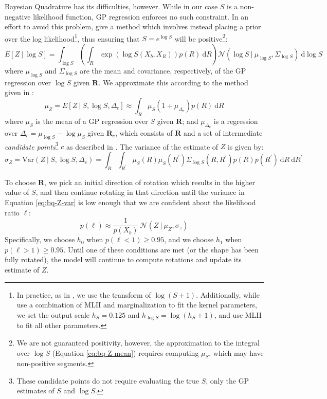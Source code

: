 \documentclass{article} %
\begin{document}
Bayesian Quadrature has its difficulties, however. While in our case
$S$ is a non-negative likelihood function, GP regression enforces no
such constraint. In an effort to avoid this problem,
\cite{Osborne:2012tm} give a method which involves instead placing a
prior over the log likelihood\footnote{In practice, as in
  \cite{Osborne:2012tm}, we use the transform of
  $\log(S+1)$. Additionally, while \cite{Osborne:2012tm} use a
  combination of MLII and marginalization to fit the kernel
  parameters, we set the output scale $h_S=0.125$ and $h_{\log
    S}=\log(h_S + 1)$, and use MLII to fit all other parameters.},
thus ensuring that $S=e^{\log S}$ will be positive\footnote{We are not
  guaranteed positivity, however, the approximation to the integral
  over $\log S$ (Equation \ref{eq:bq-Z-mean}) requires computing
  $\mu_S$, which may have non-positive segments.}:
\begin{equation*}
  E[Z\ \vert \ \log S]=\int_{\log S}\left(\int_R \exp(\log{S(X_b,X_R)})p(R)\ \mathrm{d}R\right)\mathcal{N}\left(\log{S}\ \vert \ \mu_{\log S}, \Sigma_{\log S}\right)\ \mathrm{d}\log S
\end{equation*}
where $\mu_{\log S}$ and $\Sigma_{\log S}$ are the mean and
covariance, respectively, of the GP regression over $\log S$ given
$\mathbf{R}$. We approximate this according to the method given in
\cite{Osborne:2012tm}:
\begin{equation}
  \mu_Z=E[Z\ \vert \ S, \log S, \Delta_c] \approx \int_R \mu_{S}(1 + \mu_{\Delta_c}) p(R)\ \mathrm{d}R 
  \label{eq:bq-Z-mean}
\end{equation}
where $\mu_S$ is the mean of a GP regression over $S$ given
$\mathbf{R}$; and $\mu_{\Delta_c}$ is a regression over
$\Delta_c=\mu_{\log S} - \log \mu_S$ given $\mathbf{R}_c$, which
consists of $\mathbf{R}$ and a set of intermediate \emph{candidate
  points}\footnote{These candidate points do not require evaluating
  the true $S$, only the GP estimates of $S$ and $\log S$.} $c$ as
described in \cite{Osborne:2012tm}. The variance of the estimate of
$Z$ is given by:
\begin{equation}
  \sigma_Z=\mathrm{Var}(Z\ \vert \ S, \log S, \Delta_c) = \int_R\int_{R^\prime} \mu_S(R)\mu_S(R^\prime) \Sigma_{\log S}(R, R^\prime)p(R)p(R^\prime)\ \mathrm{d}R\ \mathrm{d}R^\prime
  \label{eq:bq-Z-var}
\end{equation}

To choose $\mathbf{R}$, we pick an initial direction of rotation which
results in the higher value of $S$, and then continue rotating in that
direction until the variance in Equation \ref{eq:bq-Z-var} is low
enough that we are confident about the likelihood ratio $\ell$:
\begin{equation*}
p(\ell)\approx\frac{1}{p(X_b)}\ \mathcal{N}(Z\ \vert\ \mu_Z, \sigma_z)
\end{equation*}
Specifically, we choose $h_0$ when $p(\ell < 1)\geq 0.95$, and we
choose $h_1$ when $p(\ell > 1)\geq 0.95$. Until one of these
conditions are met (or the shape has been fully rotated), the model
will continue to compute rotations and update its estimate of $Z$.
\end{document}
